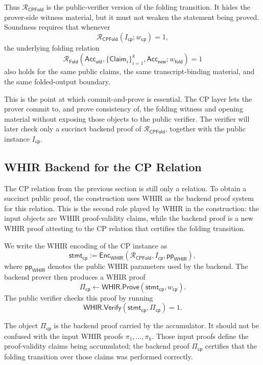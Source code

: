 \documentclass[11pt]{article}
\theoremstyle{definition}
\newcommand{\WHIR}{\mathsf{WHIR}}
\newcommand{\Acc}{\mathsf{Acc}}
\newcommand{\Verify}{\mathsf{Verify}}
\newcommand{\Prove}{\mathsf{Prove}}
\newcommand{\Rfold}{\mathcal{R}_{\mathsf{Fold}}}
\newcommand{\Rcp}{\mathcal{R}_{\mathsf{CPFold}}}
\begin{document}
Thus $\Rcp$ is the public-verifier version of the folding transition. It hides
the prover-side witness material, but it must not weaken the statement being
proved. Soundness requires that whenever
\[
  \Rcp(I_{\mathsf{cp}};w_{\mathsf{cp}})=1,
\]
the underlying folding relation
\[
  \Rfold\!\left(
    \Acc_{\mathsf{old}},
    \{\mathsf{Claim}_i\}_{i=1}^k,
    \Acc_{\mathsf{new}};
    w_{\mathsf{fold}}
  \right)=1
\]
also holds for the same public claims, the same transcript-binding material,
and the same folded-output boundary.

This is the point at which commit-and-prove is essential. The CP layer lets the
prover commit to, and prove consistency of, the folding witness and opening
material without exposing those objects to the public verifier. The verifier
will later check only a succinct backend proof of $\Rcp$, together with the
public instance $I_{\mathsf{cp}}$.

\subsection{WHIR Backend for the CP Relation}
\label{sec:whir-backend-for-cp-relation}

The CP relation from the previous section is still only a relation. To obtain a
succinct public proof, the construction uses WHIR as the backend proof system
for this relation. This is the second role played by WHIR in the construction:
the input objects are WHIR proof-validity claims, while the backend proof is a
new WHIR proof attesting to the CP relation that certifies the folding
transition.

We write the WHIR encoding of the CP instance as
\[
  \mathsf{stmt}_{\mathsf{cp}}
  :=
  \mathsf{Enc}_{\WHIR}
  \left(
    \Rcp,
    I_{\mathsf{cp}},
    \mathsf{pp}_{\WHIR}
  \right),
\]
where $\mathsf{pp}_{\WHIR}$ denotes the public WHIR parameters used by the
backend. The backend prover then produces a WHIR proof
\[
  \Pi_{\mathsf{cp}}
  \leftarrow
  \WHIR.\Prove
  \left(
    \mathsf{stmt}_{\mathsf{cp}},
    w_{\mathsf{cp}}
  \right).
\]
The public verifier checks this proof by running
\[
  \WHIR.\Verify
  \left(
    \mathsf{stmt}_{\mathsf{cp}},
    \Pi_{\mathsf{cp}}
  \right)=1.
\]

The object $\Pi_{\mathsf{cp}}$ is the backend proof carried by the accumulator.
It should not be confused with the input WHIR proofs $\pi_1,\ldots,\pi_k$.
Those input proofs define the proof-validity claims being accumulated; the
backend proof $\Pi_{\mathsf{cp}}$ certifies that the folding transition over
those claims was performed correctly.
\end{document}
